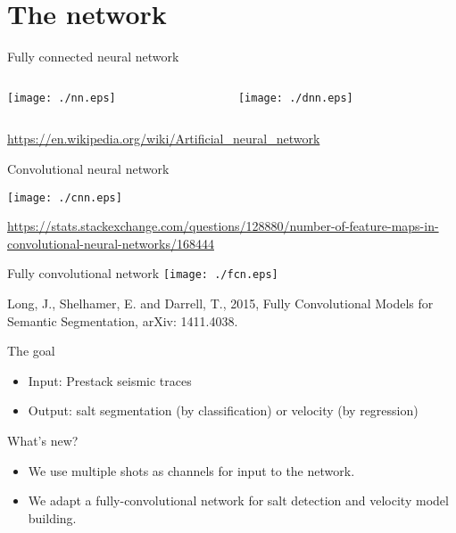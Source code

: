 \documentclass[aspectratio=169]{beamer}
\begin{document}
\section{The network}
\begin{frame}{Fully connected neural network}

\begin{columns}
  \begin{column}{0.50\textwidth}
    \center
    \texttt{[image: ./nn.eps]}
  \end{column}
  \begin{column}{0.50\textwidth}
    \center
    \texttt{[image: ./dnn.eps]}
  \end{column}
\end{columns}

\tiny{\url{https://en.wikipedia.org/wiki/Artificial_neural_network}}
\end{frame}
\begin{frame}{Convolutional neural network}

\center
\texttt{[image: ./cnn.eps]}

\tiny{\url{https://stats.stackexchange.com/questions/128880/number-of-feature-maps-in-convolutional-neural-networks/168444}}
\end{frame}
\begin{frame}{Fully convolutional network}
    \center
    \texttt{[image: ./fcn.eps]}

\tiny{Long, J., Shelhamer, E. and Darrell, T., 2015, Fully Convolutional Models for Semantic Segmentation, arXiv: 1411.4038.}
\end{frame}
\begin{frame}
\begin{block}{The goal}
\begin{itemize}
\item{Input: Prestack seismic traces}
\item{Output: salt segmentation (by classification) or velocity (by regression)}
\end{itemize}
\end{block}
\begin{block}{What's new?}
\begin{itemize}
\item{We use multiple shots as channels for input to the network.}
\item{We adapt a fully-convolutional network for salt detection and velocity model building.}
\end{itemize}
\end{block}
\end{frame}
\end{document}
